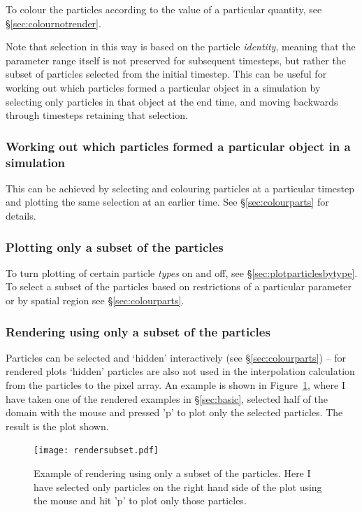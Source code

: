 \documentclass[a4paper,10pt]{article}
\begin{document}
 To colour the particles according to the value of a particular quantity, see \S\ref{sec:colournotrender}.

 Note that selection in this way is based on the particle \emph{identity}, meaning that the parameter range itself is not preserved for subsequent timesteps, but rather the subset of particles selected from the initial timestep. This can be useful for working out which particles formed a particular object in a simulation by selecting only particles in that object at the end time, and moving backwards through timesteps retaining that selection.

\subsubsection{ Working out which particles formed a particular object in a simulation}
This can be achieved by selecting and colouring particles at a particular timestep and plotting the same selection at an earlier time. See \S\ref{sec:colourparts} for details.

\subsubsection{ Plotting only a subset of the particles}
 To turn plotting of certain particle \emph{types} on and off, see \S\ref{sec:plotparticlesbytype}. To select a subset of the particles based on restrictions of a particular parameter or by spatial region see \S\ref{sec:colourparts}.

\subsubsection{ Rendering using only a subset of the particles}
\label{sec:rendersubset}
 Particles can be selected and `hidden' interactively (see \S\ref{sec:colourparts}) -- for rendered plots `hidden' particles are also not used in the interpolation calculation from the particles to the pixel array. An example is shown in Figure~\ref{fig:rendersubset}, where I have taken one of the rendered examples in \S\ref{sec:basic}, selected half of the domain with the mouse and pressed 'p' to plot only the selected particles. The result is the plot shown.
\begin{figure}[h]
\begin{center}
\texttt{[image: rendersubset.pdf]}
\caption{Example of rendering using only a subset of the particles. Here I have selected only particles on the right hand side of the plot using the mouse and hit 'p' to plot only those particles.}
\label{fig:rendersubset}
\end{center}
\end{figure}
\end{document}
